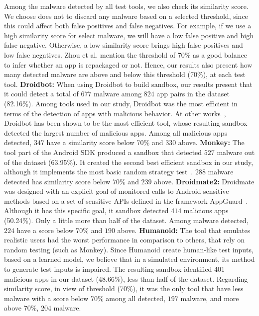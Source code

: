 Among the malware detected by all test tools, we also check its similarity score. We choose does not to discard any malware based on a selected threshold, since this could affect both false positives and false negatives. For example, if we use a high similarity score for select malware, we will have a low false positive and high false negative. Otherwise, a low similarity score brings high false positives and low false negatives. Zhou et al.\cite{DBLP:conf/codaspy/ZhouZJN12} mention the threshold of 70\% as a good balance to infer whether an app is repackaged or not. Hence, our results also present how many detected malware are above and below this threshold (70\%), at each test tool.\newline
\newline
\textbf{Droidbot:} When using Droidbot to build sandbox, our results present that it could detect a total of $677$ malware among $824$ app pairs in the dataset (82.16\%). Among tools used in our study, Droidbot was the most efficient in terms of the detection of apps with malicious behavior. At other works~\cite{DBLP:conf/wcre/BaoLL18}\cite{DBLP:journals/jss/CostaMMSSBNR22}, Droidbot has been shown to be the most efficient tool, whose resulting sandbox detected the largest number of malicious apps. Among all malicious apps detected, $347$ have a similarity score below 70\% and $330$ above.\newline
\newline
\textbf{Monkey:} The tool part of the Android SDK produced a sandbox that detected $527$ malware out of the dataset (63.95\%). It created the second best efficient sandbox in our study, although it implements the most basic random strategy test~\cite{DBLP:conf/icst/WetzlmaierRP16}\cite{DBLP:conf/kbse/ChoudharyGO15}. $288$ malware detected has similarity score below 70\% and $239$ above.   \newline
\newline
\textbf{Droidmate2:} Droidmate was designed with an explicit goal of monitored calls to Android sensitive methods based on a set of sensitive APIs defined in the framework AppGuard~\cite{DBLP:conf/esorics/BackesGHMS13}. Although it has this specific goal, it sandbox detected $414$ malicious apps (50.24\%). Only a little more than half of the dataset. Among malware detected, $224$ have a score below 70\% and $190$ above.\newline
\newline
\textbf{Humanoid:}  The tool that emulates realistic users had the worst performance in comparison to others, that rely on random testing (such as Monkey). Since Humanoid create human-like test inputs, based on a learned model, we believe that in a simulated environment, its method to generate test inputs is impaired. The resulting sandbox identified 401 malicious apps in our dataset (48.66\%), less than half of the dataset. Regarding similarity score, in view of threshold (70\%), it was the only tool that have less malware with a score below 70\% among all detected, $197$ malware, and more above 70\%, $204$ malware.

